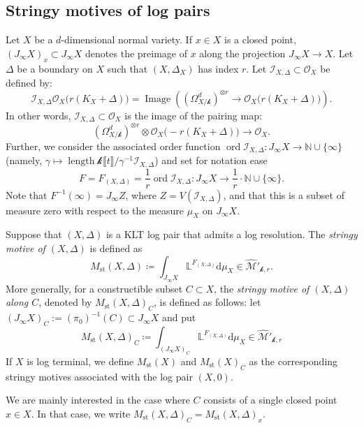 \documentclass[12pt]{amsart}
\theoremstyle{plain}   %
\theoremstyle{definition}    %
\theoremstyle{remark}    %
\numberwithin{equation}{theorem}
\DeclareMathOperator{\length}{{length}}
\DeclareMathOperator{\st}{\mathrm{st}}
\DeclareMathOperator{\ord}{{ord}}
\DeclareMathOperator{\Image}{Image}
\newcommand{\kay}{\mathcal{k}}
\newcommand{\sI}{\mathcal{I}}
\newcommand{\sM}{\mathcal{M}}
\newcommand{\sO}{\mathcal{O}}
\newcommand{\bL}{\mathbb{L}}
\newcommand{\bN}{\mathbb{N}}
\begin{document}
\subsection{Stringy motives of log pairs} \label{sec.StringyMotives} Let $X$ be a $d$-dimensional normal variety. If $x \in X$ is a closed point, $(J_{\infty}X)_{x} \subset J_{\infty}X$ denotes the preimage of $x$ along the projection $J_{\infty}X\to X$. Let $\Delta$ be a boundary on $X$ such that $(X,\Delta_X)$ has index $r$. Let $\sI_{X, \Delta}\subset\sO_{X}$ be defined by:
\[
\sI_{X,\Delta}\sO_X\big(r(K_X + \Delta)\big)=\Image\left(\left(\Omega_{X/\kay}^{d}\right)^{\otimes r}\to\sO_X\big(r(K_X + \Delta)\big)\right).
\]
In other words, $\sI_{X, \Delta}\subset\sO_{X}$ is the image of the pairing map:
\[
\left(\Omega_{X/\kay}^{d}\right)^{\otimes r} \otimes \sO_X\big(-r(K_X + \Delta)\big) \to \sO_X.
\]
Further, we consider the associated order function $\ord \sI_{X,\Delta}\colon J_{\infty}X\to\bN \cup \{\infty\}$ (namely, $\gamma \mapsto \length \kay\llbracket  t\rrbracket/\gamma^{-1} \sI_{X,\Delta}$) and set for notation ease
\[
F=F_{(X,\Delta)} = \frac{1}{r} \ord \sI_{X,\Delta}\colon J_{\infty}X\to \frac{1}{r} \cdot \bN\cup\{\infty\}.
\]
Note that $F^{-1}(\infty)=J_{\infty}Z$, where $Z = V(\sI_{X,\Delta})$, and that this is a subset of measure zero with respect to the measure $\mu_X$ on $J_{\infty} X$.
\begin{definition}
Suppose that $(X,\Delta)$ is a KLT log pair that admits a log resolution. The \emph{stringy motive of $(X,\Delta)$} is defined as
\[
M_{\st}(X,\Delta) \coloneqq \int_{J_{\infty}X}\bL^{F_{(X,\Delta)}}\mathrm{d}\mu_{X}\in\hat{\sM}'_{\kay,r}.
\]
More generally, for a constructible subset $C\subset X$, the \emph{stringy motive of $(X,\Delta)$ along $C$}, denoted by $M_{\st}(X,\Delta)_C$, is defined as follows: let $(J_\infty X)_C:=(\pi_0)^{-1} (C) \subset J_\infty X$ and put 
\[
M_{\st}(X,\Delta)_C\coloneqq \int_{(J_{\infty}X)_{C}}\bL^{F_{(X,\Delta)}}\mathrm{d}\mu_{X}\in\hat{\sM}'_{\kay,r}
\]
If $X$ is log terminal, we define $M_{\st}(X)$ and $M_{\st}(X)_C$ as the corresponding stringy motives associated with the log pair $(X,0)$.
\end{definition}

We are mainly interested in the case where $C$ consists of a single closed point $x\in X$. In that case, we write $M_{\mathrm{st}}(X,\Delta)_C=M_{\mathrm{st}}(X,\Delta)_x$. 
\end{document}

